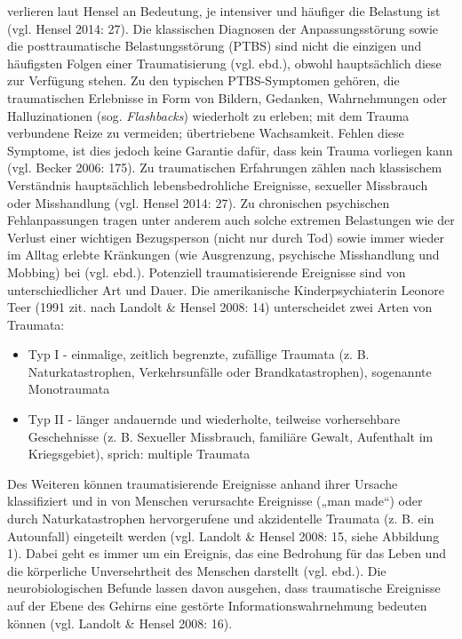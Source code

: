 verlieren laut Hensel an Bedeutung, je intensiver und häufiger die Belastung ist (vgl. Hensel 2014: 27). Die klassischen Diagnosen der Anpassungsstörung sowie die posttraumatische Belastungsstörung (PTBS) sind nicht die einzigen und häufigsten Folgen einer Traumatisierung (vgl. ebd.), obwohl hauptsächlich diese zur Verfügung stehen. Zu den typischen PTBS-Symptomen gehören, die traumatischen Erlebnisse in Form von Bildern, Gedanken, Wahrnehmungen oder Halluzinationen (sog. \textit{Flashbacks}) wiederholt zu erleben; mit dem Trauma verbundene Reize zu vermeiden; übertriebene Wachsamkeit. Fehlen diese Symptome, ist dies jedoch keine Garantie dafür, dass kein Trauma vorliegen kann (vgl. Becker 2006: 175). Zu traumatischen Erfahrungen zählen nach klassischem Verständnis hauptsächlich lebensbedrohliche Ereignisse, sexueller Missbrauch oder Misshandlung (vgl. Hensel 2014: 27). Zu chronischen psychischen Fehlanpassungen tragen unter anderem auch solche extremen Belastungen wie der Verlust einer wichtigen Bezugsperson (nicht nur durch Tod) sowie immer wieder im Alltag erlebte Kränkungen (wie Ausgrenzung, psychische Misshandlung und Mobbing) bei (vgl. ebd.). Potenziell traumatisierende Ereignisse sind von unterschiedlicher Art und Dauer. Die amerikanische Kinderpsychiaterin Leonore Teer (1991 zit. nach Landolt \& Hensel 2008: 14) unterscheidet zwei Arten von Traumata:

\begin{itemize}
\item Typ I - einmalige, zeitlich begrenzte, zufällige Traumata (z. B. Naturkatastrophen, Verkehrsunfälle oder Brandkatastrophen), sogenannte Monotraumata
\item Typ II - länger andauernde und wiederholte, teilweise vorhersehbare Geschehnisse (z. B. Sexueller Missbrauch, familiäre Gewalt, Aufenthalt im Kriegsgebiet), sprich: multiple Traumata
\end{itemize}

Des Weiteren können traumatisierende Ereignisse anhand ihrer Ursache klassifiziert und in von Menschen verursachte Ereignisse („man made“) oder durch Naturkatastrophen hervorgerufene und akzidentelle Traumata (z. B. ein Autounfall) eingeteilt werden (vgl. Landolt \& Hensel 2008: 15, siehe Abbildung 1). Dabei geht es immer um ein Ereignis, das eine Bedrohung für das Leben und die körperliche Unversehrtheit des Menschen darstellt (vgl. ebd.). Die neurobiologischen Befunde lassen davon ausgehen, dass traumatische Ereignisse auf der Ebene des Gehirns eine gestörte Informationswahrnehmung bedeuten können (vgl. Landolt \& Hensel 2008: 16).

